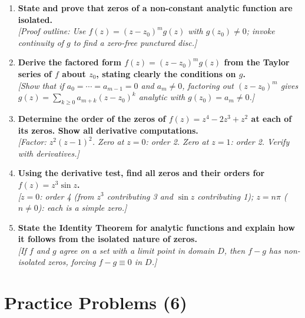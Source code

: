 \documentclass[12pt,a4paper]{article}
\begin{document}
\begin{enumerate}[label=\textbf{D\arabic*.}]

\item \textbf{State and prove that zeros of a non-constant analytic function are isolated.}\\
\textit{[Proof outline: Use $f(z)=(z-z_0)^m g(z)$ with $g(z_0)\neq 0$; invoke continuity of
$g$ to find a zero-free punctured disc.]}

\item \textbf{Derive the factored form $f(z)=(z-z_0)^m g(z)$ from the Taylor series of $f$ about
$z_0$, stating clearly the conditions on $g$.}\\
\textit{[Show that if $a_0=\cdots=a_{m-1}=0$ and $a_m\neq 0$, factoring out $(z-z_0)^m$ gives
$g(z)=\sum_{k\geq 0}a_{m+k}(z-z_0)^k$ analytic with $g(z_0)=a_m\neq 0$.]}

\item \textbf{Determine the order of the zeros of $f(z)=z^4 - 2z^3 + z^2$ at each of its zeros.
Show all derivative computations.}\\
\textit{[Factor: $z^2(z-1)^2$. Zero at $z=0$: order 2. Zero at $z=1$: order 2. Verify with
derivatives.]}

\item \textbf{Using the derivative test, find all zeros and their orders for
$f(z) = z^3\sin z$.}\\
\textit{[$z=0$: order 4 (from $z^3$ contributing 3 and $\sin z$ contributing 1);
$z=n\pi$ ($n\neq 0$): each is a simple zero.]}

\item \textbf{State the Identity Theorem for analytic functions and explain how it follows from
the isolated nature of zeros.}\\
\textit{[If $f$ and $g$ agree on a set with a limit point in domain $D$, then $f-g$ has
non-isolated zeros, forcing $f-g\equiv 0$ in $D$.]}

\end{enumerate}

\section{Practice Problems (6)}
\end{document}
